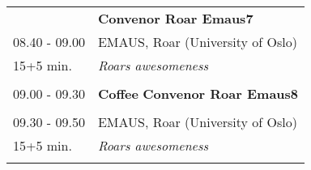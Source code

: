\begin{table}[h!]
\begin{tabular}{p{3cm}p{13cm}}
&\hfill {\bf Convenor Roar Emaus7 }\\ 
08.40 - 09.00 & EMAUS, Roar (University of Oslo)\\ 
15+5 min. & {\it Roars awesomeness}\\ 
 & \\ 
09.00 - 09.30 & {\bf Coffee} \hfill {\bf Convenor Roar Emaus8 }\\ 
 & \\ 
09.30 - 09.50 & EMAUS, Roar (University of Oslo)\\ 
15+5 min. & {\it Roars awesomeness}\\ 
 & \\ 
\end{tabular}
\end{table}


